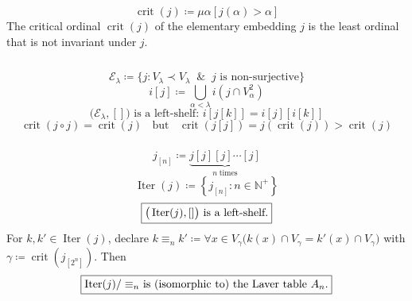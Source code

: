 \documentclass[UTF8,11pt,colorlinks,compress,openany]{beamer}%
\begin{document}
\begin{frame}\frametitle{}
\begin{columns}
\[\operatorname{crit}(j)\coloneqq \mu\alpha[j(\alpha)>\alpha]\]
The critical ordinal $\operatorname{crit}(j)$ of the elementary embedding $j$ is the least ordinal that is not invariant under $j$.
\hspace*{-8ex}
\end{columns}
\[\mathcal{E}_\lambda\coloneqq \{j: V_\lambda\prec V_\lambda\;\;\&\;\;j\mbox{ is non-surjective}\}\]
\[i[j]\coloneqq \bigcup\limits_{\alpha<\lambda}i(j\cap V_\alpha^2)\]
\[\big(\mathcal{E}_\lambda,[]\big)\mbox{ is a left-shelf: } i[j[k]]=i[j][i[k]]\]
\[\operatorname{crit}(j\circ j)=\operatorname{crit}(j)\;\;\mbox{ but }\;\;\operatorname{crit}(j[j])=j(\operatorname{crit}(j))>\operatorname{crit}(j)\]
\end{frame}

\begin{frame}\frametitle{}
\[j_{[n]}\coloneqq \underbrace{j[j][j]\cdots[j]}_{n\;\text{times}}\]
\[\operatorname{Iter}(j)\coloneqq \left\{j_{[n]}: n\in\mathbb{N}^+\right\}\]
\[\fbox{$\big(\operatorname{Iter}(j),[]\big)$ is a left-shelf.}\]
For $k,k'\in\operatorname{Iter}(j)$, declare $k\equiv_n k'\coloneqq \forall x\in V_\gamma\big(k(x)\cap V_\gamma=k'(x)\cap V_\gamma\big)$ with $\gamma\coloneqq \operatorname{crit}(j_{[2^n]})$. Then 
\[\fbox{$\operatorname{Iter}(j)/\equiv_n$ is (isomorphic to) the Laver table $A_n$.}\]
\end{frame}
\end{document}
